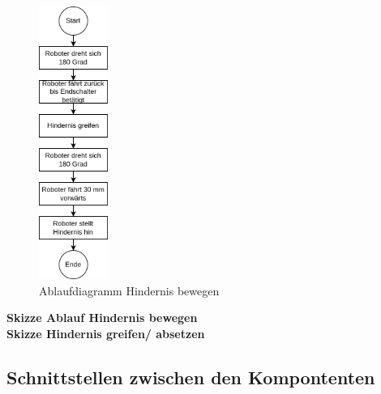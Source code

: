 \begin{figure}[H]
\centering
\includegraphics[width=0.2\textwidth]{assets/gesamtkonzept/ablaufdiagramm-hindernis-bewegen.png}
\caption{Ablaufdiagramm Hindernis bewegen}
\label{fig:ablaufdiagramm-hindernis-bewegen}
\end{figure}



\textbf{Skizze Ablauf Hindernis bewegen}\\
\textbf{Skizze Hindernis greifen/ absetzen}



\subsection{Schnittstellen zwischen den Kompontenten}



